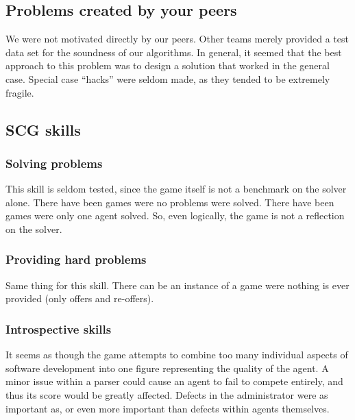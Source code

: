 \documentclass[letterpaper,12pt,oneside]{article}
\begin{document}
\subsection{Problems created by your peers}
We were not motivated directly by our peers. Other teams merely provided a test
data set for the soundness of our algorithms. In general, it seemed that the
best approach to this problem was to design a solution that worked in the
general case. Special case ``hacks'' were seldom made, as they tended to be
extremely fragile. 

\subsection{SCG skills}

\subsubsection{Solving problems}

This skill is seldom tested, since the game itself is not a benchmark on
the solver alone. There have been games were no problems were solved. There
have been games were only one agent solved. So, even logically, the game is
not a reflection on the solver.

\subsubsection{Providing hard problems}

Same thing for this skill. There can be an instance of a game were nothing
is ever provided (only offers and re-offers).

\subsubsection{Introspective skills}
It seems as though the game attempts to combine too many individual aspects of
software development into one figure representing the quality of the agent.
A minor issue within a parser could cause an agent to fail to compete
entirely, and thus its score would be greatly affected. Defects in the
administrator were as important as, or even more important than defects within
agents themselves.
\end{document}
